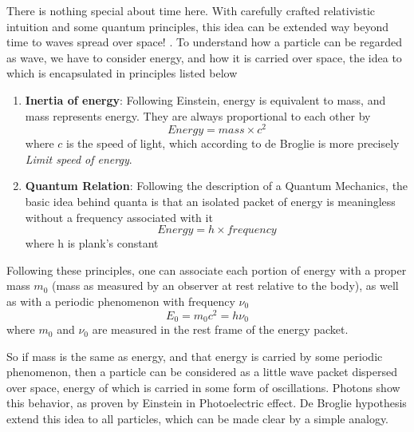 \documentclass[11pt, a4paper]{article}
\newcommand{\quotedsingle}[1]{#1}	%
\newcommand{\quotedsingleit}[1]{\quotedsingle{\textit{#1}}}	%
\begin{document}
	There is nothing special about time here. With carefully crafted relativistic intuition and some quantum principles, this idea can be extended way beyond time to waves spread over space! \cite{de_broglie_thesis}. To understand how a particle can be regarded as wave, we have to consider energy, and how it is carried over space, the idea to which is encapsulated in principles listed below
	\begin{enumerate}
		\item \textbf{Inertia of energy}: Following Einstein, energy is equivalent to mass, and mass represents energy. They are always proportional to each other by
		\begin{equation*}
			Energy = mass \times c^{2}
		\end{equation*}
		where $c$ is the speed of light, which according to de Broglie is more precisely \quotedsingleit{Limit speed of energy}.
		\item \textbf{Quantum Relation}: Following the description of a Quantum Mechanics, the basic idea behind quanta is that an isolated packet of energy is meaningless without a frequency associated with it
		\begin{equation*}
			Energy = h \times frequency
		\end{equation*}
		where h is plank's constant
	\end{enumerate}
	Following these principles, one can associate each portion of energy with a proper mass $m_{0}$ (mass as measured by an observer at rest relative to the body), as well as with a periodic phenomenon with frequency $\nu_{0}$ 
	\begin{equation*}
		E_{0} = m_{0}c^{2} = h \nu_{0}
	\end{equation*}
	where $m_{0}$ and $\nu_{0}$ are measured in the rest frame of the energy packet.
	
	So if mass is the same as energy, and that energy is carried by some periodic phenomenon, then a particle can be considered as a little wave packet dispersed over space, energy of which is carried in some form of oscillations. Photons show this behavior, as proven by Einstein in Photoelectric effect. De Broglie hypothesis extend this idea to all particles, which can be made clear by a simple analogy.
\end{document}
